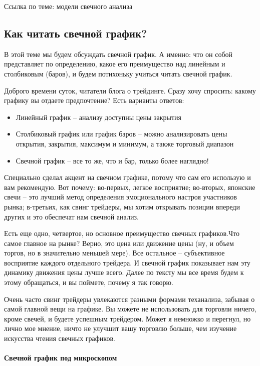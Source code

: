 \documentclass[a5paper]{article}
\begin{document}
Ссылка по теме: модели свечного анализа

\subsection{Как читать свечной график?}

В этой теме мы будем обсуждать свечной график. А именно: что он собой представляет по определению, какое его преимущество над линейным и столбиковым (баров), и будем потихоньку учиться читать свечной график.

Доброго времени суток, читатели блога о трейдинге. Сразу хочу спросить: какому графику вы отдаете предпочтение? Есть варианты ответов:
\begin{itemize}
\item     Линейный график – анализу доступны цены закрытия
\item     Столбиковый график или график баров – можно анализировать цены открытия, закрытия, максимум и минимум, а также торговый диапазон
\item     Свечной график – все то же, что и бар, только более наглядно!
\end{itemize}

Специально сделал акцент на свечном графике, потому что сам его использую и вам рекомендую. Вот почему: во-первых, легкое восприятие; во-вторых, японские свечи – это лучший метод определения эмоционального настроя участников рынка; в-третьих, как свинг трейдеры, мы хотим открывать позиции впереди других и это обеспечат нам свечной анализ.

Есть еще одно, четвертое, но основное преимущество свечных графиков.Что самое главное на рынке? Верно, это цена или движение цены (ну, и объем торгов, но в значительно меньшей мере). Все остальное – субъективное восприятие каждого отдельного трейдера. И свечной график показывает нам эту динамику движения цены лучше всего. Далее по тексту мы все время будем к этому обращаться, и вы поймете, почему я так говорю.

Очень часто свинг трейдеры увлекаются разными формами теханализа,
забывая о самой главной вещи на графике. Вы можете не использовать для
торговли ничего, кроме свечей, и будете успешным трейдером. Может я
немножко и перегнул, но лично мое мнение, ничто не улучшит вашу
торговлю больше, чем изучение искусства чтения свечных графиков.

\paragraph{Свечной график под микроскопом}
\end{document}
